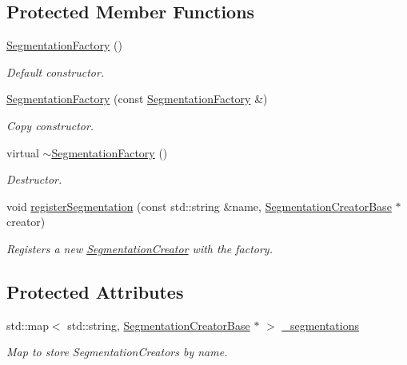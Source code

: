 \subsection*{Protected Member Functions}
\begin{DoxyCompactItemize}
\item 
\hyperlink{class_d_d4hep_1_1_d_d_segmentation_1_1_segmentation_factory_af28879ad5d0b45254c69234ec4a90fe5}{SegmentationFactory} ()
\begin{DoxyCompactList}\small\item\em Default constructor. \item\end{DoxyCompactList}\item 
\hyperlink{class_d_d4hep_1_1_d_d_segmentation_1_1_segmentation_factory_a6255e4a05ac17c8e9d14d602dbc9d925}{SegmentationFactory} (const \hyperlink{class_d_d4hep_1_1_d_d_segmentation_1_1_segmentation_factory}{SegmentationFactory} \&)
\begin{DoxyCompactList}\small\item\em Copy constructor. \item\end{DoxyCompactList}\item 
virtual \hyperlink{class_d_d4hep_1_1_d_d_segmentation_1_1_segmentation_factory_ad6a96f6c5e29ff089d4c0d4196133d07}{$\sim$SegmentationFactory} ()
\begin{DoxyCompactList}\small\item\em Destructor. \item\end{DoxyCompactList}\item 
void \hyperlink{class_d_d4hep_1_1_d_d_segmentation_1_1_segmentation_factory_afb766eaf4c362ae719d29ca764e8cdeb}{registerSegmentation} (const std::string \&name, \hyperlink{class_d_d4hep_1_1_d_d_segmentation_1_1_segmentation_creator_base}{SegmentationCreatorBase} $\ast$creator)
\begin{DoxyCompactList}\small\item\em Registers a new \hyperlink{class_d_d4hep_1_1_d_d_segmentation_1_1_segmentation_creator}{SegmentationCreator} with the factory. \item\end{DoxyCompactList}\end{DoxyCompactItemize}
\subsection*{Protected Attributes}
\begin{DoxyCompactItemize}
\item 
std::map$<$ std::string, \hyperlink{class_d_d4hep_1_1_d_d_segmentation_1_1_segmentation_creator_base}{SegmentationCreatorBase} $\ast$ $>$ \hyperlink{class_d_d4hep_1_1_d_d_segmentation_1_1_segmentation_factory_a11fdb394993e5ecbd8dcd67ce89a4552}{\_\-segmentations}
\begin{DoxyCompactList}\small\item\em Map to store SegmentationCreators by name. \item\end{DoxyCompactList}\end{DoxyCompactItemize}

